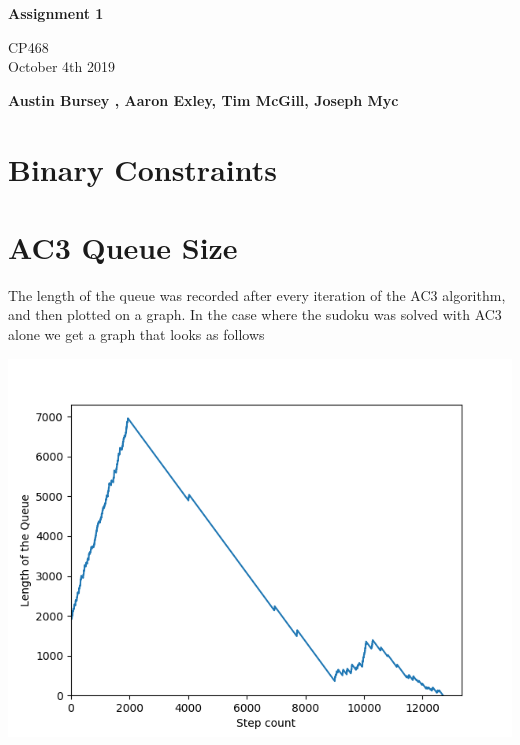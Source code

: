 \documentclass{article}
\begin{document}
\begin{titlepage}
  \pagestyle{fancy}
  \thispagestyle{fancy}
   \begin{center}
       \vspace*{1cm}
 
      \Huge
       \textbf{Assignment 1}
 
       \vspace{0.5cm}
       \Large
        CP468 \\ October 4th 2019
 
       \vspace{1.5cm}
 
       \textbf{Austin Bursey , Aaron Exley, Tim McGill, Joseph Myc}
 
       \vfill

 
       \vspace{0.8cm}
 
   \end{center}
\end{titlepage}
\setcounter{page}{2}

\section{Binary Constraints}

\section{AC3 Queue Size}

The length of the queue was recorded after every iteration of the AC3 algorithm, and then plotted on a graph.
\newline
In the case where the sudoku was solved with AC3 alone we get a graph that looks as follows

\includegraphics[scale=0.6]{Sudoku-Queue-length-plot-29.png}
\end{document}

